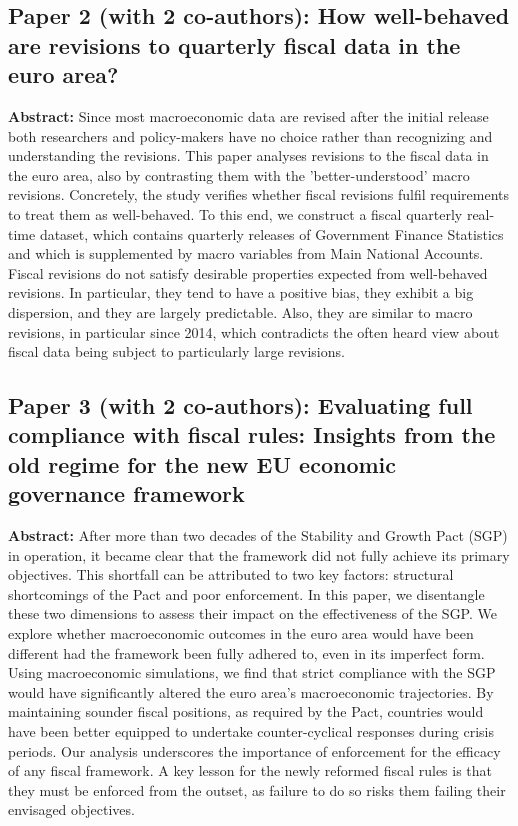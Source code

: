 \documentclass[11pt,a4paper]{article}
\begin{document}
\subsection*{Paper 2 (with 2 co-authors): How well-behaved are revisions to quarterly fiscal data in the euro area?}
\textbf{Abstract:} Since most macroeconomic data are revised after the initial release both researchers and policy-makers have no choice rather than recognizing and understanding the revisions. This paper analyses revisions to the fiscal data in the euro area, also by contrasting them with the 'better-understood' macro revisions. Concretely, the study verifies whether fiscal revisions fulfil requirements to treat them as well-behaved. To this end, we construct a fiscal quarterly real-time dataset, which contains quarterly releases of Government Finance Statistics and which is supplemented by macro variables from Main National Accounts. Fiscal revisions do not satisfy desirable properties expected from well-behaved revisions. In particular, they tend to have a positive bias, they exhibit a big dispersion, and they are largely predictable. Also, they are similar to macro revisions, in particular since 2014, which contradicts the often heard view about fiscal data being subject to particularly large revisions.

\subsection*{Paper 3 (with 2 co-authors): Evaluating full compliance with fiscal rules: Insights from the old regime for the new EU economic governance framework}
\textbf{Abstract:} After more than two decades of the Stability and Growth Pact (SGP) in operation, it became clear that the framework did not fully achieve its primary objectives. This shortfall can be attributed to two key factors: structural shortcomings of the Pact and poor enforcement. In this paper, we disentangle these two dimensions to assess their impact on the effectiveness of the SGP. We explore whether macroeconomic outcomes in the euro area would have been different had the framework been fully adhered to, even in its imperfect form. Using macroeconomic simulations, we find that strict compliance with the SGP would have significantly altered the euro area's macroeconomic trajectories. By maintaining sounder fiscal positions, as required by the Pact, countries would have been better equipped to undertake counter-cyclical responses during crisis periods. Our analysis underscores the importance of enforcement for the efficacy of any fiscal framework. A key lesson for the newly reformed fiscal rules is that they must be enforced from the outset, as failure to do so risks them failing their envisaged objectives.
\end{document}
